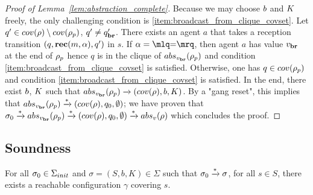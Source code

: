 \begin{proof}[Proof of Lemma~\ref{lem:abstraction_complete}]
	Because we may choose $\boss$ and $\clique$ freely, the only challenging condition is \ref{item:broadcast_from_clique_covset}.
	Let $q' \in \statesin{\run} \setminus \statesin{\run_p}$, $q' \ne q_{\textbf{br}}'$. 
	There exists an agent $a$ that takes a reception transition $(q,\textbf{rec}(m, \alpha),q')$ in $s$. 
	If $\anact = \quotemarks{\eqtestact}$, then agent $a$ has value $v_{\textbf{br}}$ at the end of $\rho_p$ hence $q$ is in the clique of $\absproj{\avalbr}{\run_p}$ and condition \ref{item:broadcast_from_clique_covset} is satisfied. Otherwise, one has $q \in \statesin{\run_p}$ and condition \ref{item:broadcast_from_clique_covset} is satisfied.
	In the end, there exist $\boss$, $\clique$ such that $\absproj{\avalbr}{\run_p} \step{} (\statesin{\run}, \boss,\clique)$. By a "gang reset", this implies that $\absproj{\avalbr}{\run_p} \step{*} (\statesin{\run}, q_0, \emptyset)$; we have proven that $\aconfiginit \step{*}\absproj{\avalbr}{\run_p} \step{*} (\statesin{\run}, q_0, \emptyset) \step{*} \absproj{\aval}{\run}$ which concludes the proof. 
\end{proof}
\fi


\subsection{Soundness}

\begin{lemma}
	\label{cor:soundness}
	For all $\sigma_0 \in \aconfiginitset$ and $\sigma = (S, b, K) \in \Sigma$ such that $\sigma_0 \xrightarrow{*} \sigma$, for all $s \in S$, there exists a reachable configuration $\gamma$ covering $s$.
\end{lemma}


